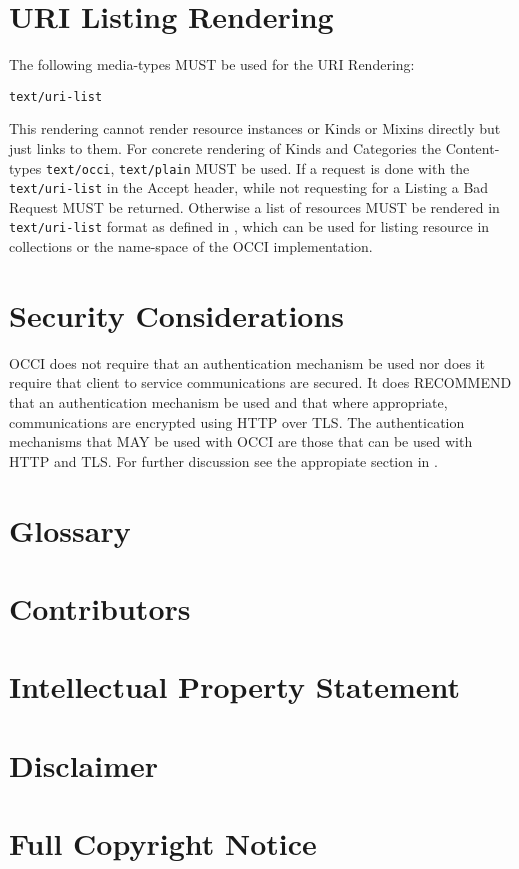 \documentclass[10pt,a4paper]{article}
\begin{document}
\section{URI Listing Rendering}
\label{sec:urilist}
The following media-types MUST be used for the URI Rendering:

{\tt text/uri-list}

This rendering cannot render resource instances or Kinds or Mixins directly but just links to them. For concrete rendering of Kinds and Categories the Content-types \texttt{text/occi}, \texttt{text/plain} MUST be used. If a request is done with the \texttt{text/uri-list} in the Accept header, while not requesting for a Listing a Bad Request MUST be returned. Otherwise a list of resources MUST be rendered in \texttt{text/uri-list} format as defined in \cite{rfc2483}, which can be used for listing resource in collections or the name-space of the OCCI implementation.

\section{Security Considerations}
OCCI does not require that an authentication mechanism be used nor
does it require that client to service communications are secured. It
does RECOMMEND that an authentication mechanism be used and that where
appropriate, communications are encrypted using HTTP over TLS. The
authentication mechanisms that MAY be used with OCCI are those that
can be used with HTTP and TLS. For further discussion see the
appropiate section in \cite{occi:http_protocol}.

\section{Glossary}
\label{sec:glossary}


\section{Contributors}


\section{Intellectual Property Statement}


\section{Disclaimer}


\section{Full Copyright Notice}




\end{document}
